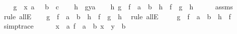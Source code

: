 \begin{isabellebody}
\ \ \isamarkupfalse%
\ {\isacharquery}g\ {\isacharequal}\ {\isachardoublequoteopen}{\isacharparenleft}{\isasymlambda}x{\isachardot}\ a{}{\isacharparenright}\ \ {\isacharcolon}{\isacharcolon}\ {\isacharprime}b\ {\isasymRightarrow}\ {\isacharprime}c{\isachardoublequoteclose}\isanewline
\ \ \isamarkupfalse%
\ {\isacharquery}h\ {\isacharequal}\ {\isachardoublequoteopen}{\isacharquery}g{\isacharparenleft}y{}{\isacharcolon}{\isacharequal}a{}{\isacharparenright}{\isachardoublequoteclose}\isanewline
\ \ \isamarkupfalse%
\ {\isachardoublequoteopen}{\isasymforall}h\ {\isachardot}{\isacharparenleft}{\isacharquery}g\ {\isasymcirc}\ {\isacharparenleft}f\ {\isacharcolon}{\isacharcolon}\ {\isacharprime}a\ {\isasymRightarrow}\ {\isacharprime}b{\isacharparenright}\ {\isacharequal}\ h\ {\isasymcirc}\ f{\isacharparenright}\ {\isasymlongrightarrow}\ {\isacharparenleft}{\isacharquery}g\ {\isacharequal}\ h{\isacharparenright}{\isachardoublequoteclose}\isanewline
\ \ \ \ \isamarkupfalse%
\ assms{\isacharparenleft}{}{\isacharparenright}\ \isamarkupfalse%
\ {\isacharparenleft}rule\ allE{\isacharparenright}\isanewline
\ \ \isamarkupfalse%
\ {}{\isacharcolon}{\isachardoublequoteopen}{\isacharparenleft}{\isacharquery}g\ {\isasymcirc}\ {\isacharparenleft}f\ {\isacharcolon}{\isacharcolon}\ {\isacharprime}a\ {\isasymRightarrow}\ {\isacharprime}b{\isacharparenright}\ {\isacharequal}\ {\isacharquery}h\ {\isasymcirc}\ f{\isacharparenright}\ {\isasymlongrightarrow}\ {\isacharparenleft}{\isacharquery}g\ {\isacharequal}\ {\isacharquery}h{\isacharparenright}{\isachardoublequoteclose}\ \isamarkupfalse%
\ {\isacharparenleft}rule\ allE{\isacharparenright}\isanewline
\ \ \isamarkupfalse%
\ {}{\isacharcolon}\ {\isachardoublequoteopen}{\isacharparenleft}{\isacharquery}g\ {\isasymcirc}\ {\isacharparenleft}f\ {\isacharcolon}{\isacharcolon}\ {\isacharprime}a\ {\isasymRightarrow}\ {\isacharprime}b{\isacharparenright}\ {\isacharequal}\ {\isacharquery}h\ {\isasymcirc}\ f{\isacharparenright}{\isachardoublequoteclose}\isanewline
\ \ \ \ \isamarkupfalse%
\ {\isacharbrackleft}{\isacharbrackleft}simp{\isacharunderscore}trace{\isacharbrackright}{\isacharbrackright}\isanewline
\ \ \ \ \isamarkupfalse%
\ {\isacartoucheopen}{\isasymnexists}x\ {\isacharcolon}{\isacharcolon}\ {\isacharprime}a{\isachardot}\ {\isacharparenleft}f\ {\isacharcolon}{\isacharcolon}\ {\isacharprime}a\ {\isasymRightarrow}\ {\isacharprime}b{\isacharparenright}\ x\ {\isacharequal}\ {\isacharparenleft}y{}\ {\isacharcolon}{\isacharcolon}\ {\isacharprime}b{\isacharparenright}{\isacartoucheclose}\ \isamarkupfalse%

\end{isabellebody}
